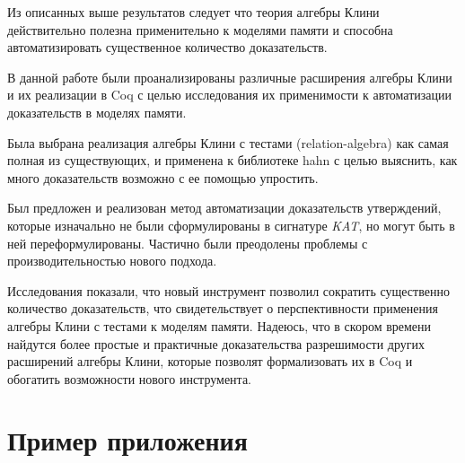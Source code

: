 \documentclass[times
              ]{itmo-student-thesis}
\begin{document}
  \chapterconclusion %

    Из описанных выше результатов следует что теория алгебры Клини действительно полезна применительно
    к моделями памяти и способна автоматизировать существенное количество доказательств.

\startconclusionpage

  В данной работе были проанализированы различные расширения алгебры Клини и их реализации в Coq
  с целью исследования их применимости к автоматизации доказательств в моделях памяти.

  Была выбрана реализация алгебры Клини с тестами (relation-algebra) как самая полная из существующих, и применена к
  библиотеке hahn с целью выяснить, как много доказательств возможно с ее помощью упростить.

  Был предложен и реализован метод автоматизации доказательств утверждений, которые изначально не
  были сформулированы в сигнатуре \textit{KAT}, но могут быть в ней переформулированы.
  Частично были преодолены проблемы с производительностью нового подхода.

  Исследования показали, что новый инструмент позволил сократить существенно количество доказательств,
  что свидетельствует о перспективности применения алгебры Клини с тестами к моделям памяти.
  Надеюсь, что в скором времени найдутся более простые и практичные доказательства разрешимости других
  расширений алгебры Клини, которые позволят формализовать их в Coq и обогатить возможности нового
  инструмента.

\printmainbibliography

\appendix

\chapter{Пример приложения}\label{sec:app:1}
\end{document}
